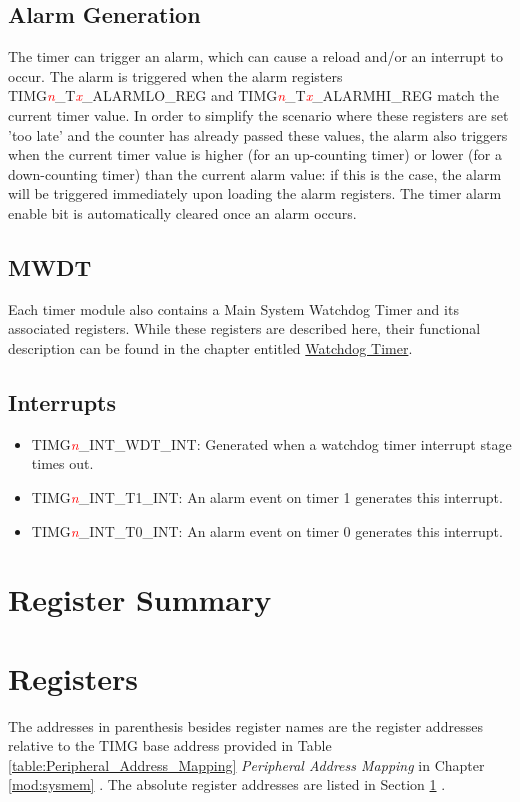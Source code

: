 \documentclass[main\_\_EN.tex]{subfiles}
\begin{document}
\subsection{Alarm Generation}

The timer can trigger an alarm, which can cause a reload and/or an interrupt to occur. The alarm is triggered when the alarm registers TIMG\textcolor{red}{\it{n}}\_T\textcolor{red}{\it{x}}\_ALARMLO\_REG and TIMG\textcolor{red}{\it{n}}\_T\textcolor{red}{\it{x}}\_ALARMHI\_REG match the current timer value. In order to simplify the scenario where these registers are set 'too late' and the counter has already passed these values, the alarm also triggers when the current timer value is higher (for an up-counting timer) or lower (for a down-counting timer) than the current alarm value: if this is the case, the alarm will be triggered immediately upon loading the alarm registers. The timer alarm enable bit is automatically cleared once an alarm occurs.

\subsection{MWDT}
Each timer module also contains a Main System Watchdog Timer and its associated registers. While these registers are described here, their functional description can be found in the chapter entitled \hyperref[mod:wdt]{Watchdog Timer}.

\subsection{Interrupts}
\begin{itemize}
\item \label{int:TIMERSINTWDTINT}TIMG\textcolor{red}{\it{n}}\_INT\_WDT\_INT: Generated when a watchdog timer interrupt stage times out.
\item \label{int:TIMERSINTT1INT}TIMG\textcolor{red}{\it{n}}\_INT\_T1\_INT: An alarm event on timer 1 generates this interrupt.
\item \label{int:TIMERSINTT0INT}TIMG\textcolor{red}{\it{n}}\_INT\_T0\_INT: An alarm event on timer 0 generates this interrupt.
\end{itemize}


\hypertarget{timg-reg-summ}{}
\section{Register Summary}\label{timer_registers_summary}

{\clearpage}
\section{Registers}\label{timer_registers}
The addresses in parenthesis besides register names are the register addresses relative to the TIMG base address provided in Table \ref{table:Peripheral_Address_Mapping} \textit{Peripheral Address Mapping} in Chapter \ref{mod:sysmem} \textit{}. The absolute register addresses are listed in Section \ref{timer_registers_summary} \textit{}.

\end{document}
